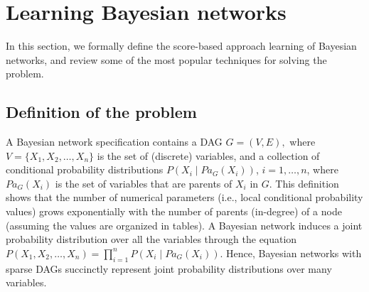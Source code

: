 \section{Learning Bayesian networks}
\label{sec:learning}

In this section, we formally define the score-based approach learning of Bayesian networks, and review some of the most popular techniques for solving the problem.

\subsection{Definition of the problem}
\label{subsec:definition}

A Bayesian network specification contains a DAG \( G = ( V , E ), \) where $V = \{ X_1 , X_2 , \ldots , X_n \}$ is the set of (discrete) variables, and a collection of conditional probability distributions \( P( X_i \mid {Pa}_G( X_i ) ) \), $i=1,\ldots,n$, where ${Pa}_G( X_i )$ is the set of variables that are parents of $X_i$ in $G$. This definition shows that the number of numerical parameters (i.e., local conditional probability values) grows exponentially with the number of parents (in-degree) of a node (assuming the values are organized in tables). A Bayesian network induces a joint probability distribution over all the variables through the equation
$  P( X_1 , X_2 , \ldots , X_n ) = \prod_{i=1}^{n} P( X_i \mid {Pa}_G( X_i ) ) $.
Hence, Bayesian networks with sparse DAGs succinctly represent joint probability distributions over many variables.

